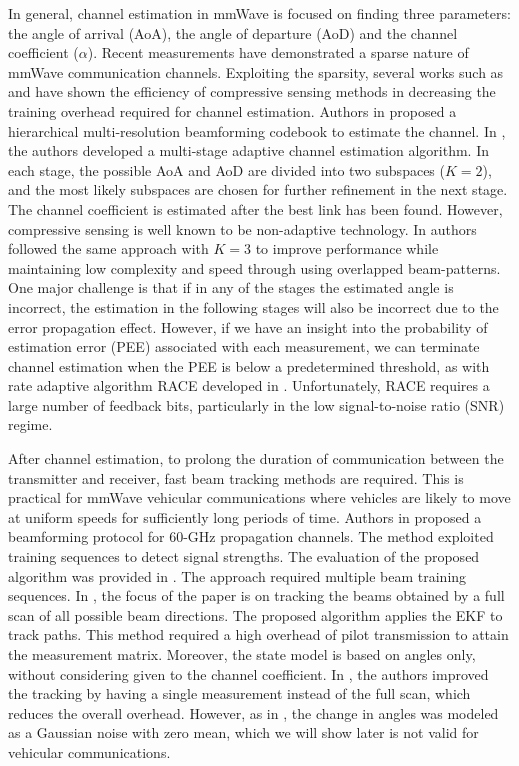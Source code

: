 \documentclass{ieeeaccess}
\begin{document}
In general, channel estimation in mmWave is focused on finding three parameters: the angle of arrival (AoA), the angle of departure (AoD) and the channel coefficient ($\alpha$). Recent measurements have demonstrated a sparse nature of mmWave communication channels\cite{ref6}. Exploiting the sparsity, several works such as \cite{c2} and \cite{RH} have shown the efficiency of compressive sensing methods in decreasing the training overhead required for channel estimation. Authors in \cite{c1} proposed a hierarchical multi-resolution beamforming codebook to estimate the channel. In \cite{RH}, the authors developed a multi-stage adaptive channel estimation algorithm. In each stage, the possible AoA and AoD are divided into two subspaces ($K = 2$), and the most likely subspaces are chosen for further refinement in the next stage. The channel coefficient is estimated after the best link has been found. However, compressive sensing is well known to be non-adaptive technology. In \cite{overlap} authors followed the same approach with $K = 3$ to improve performance while maintaining low complexity and speed through using overlapped beam-patterns. One major challenge is that if in any of the stages the estimated angle is incorrect, the estimation in the following stages will also be incorrect due to the error propagation effect. However, if we have an insight into the probability of estimation error (PEE) associated with each measurement, we can terminate channel estimation when the PEE is below a predetermined threshold, as with rate adaptive algorithm RACE developed in \cite{RACE}. Unfortunately, RACE requires a large number of feedback bits, particularly in the low signal-to-noise ratio (SNR) regime.

After channel estimation, to prolong the duration of communication between the transmitter and receiver, fast beam tracking methods are required. This is practical for mmWave vehicular communications where vehicles are likely to move at uniform speeds for sufficiently long periods of time. Authors in \cite{midc} proposed a beamforming protocol for 60-GHz propagation channels. The method exploited training sequences to detect signal strengths. The evaluation of the proposed algorithm was provided in \cite{midc2}. The approach required multiple beam training sequences. In \cite{zhang}, the focus of the paper is on tracking the beams obtained by a full scan of all possible beam directions. The proposed algorithm applies the EKF to track paths. This method required a high overhead of pilot transmission to attain the measurement matrix. Moreover, the state model is based on angles only, without considering given to the channel coefficient. In \cite{rr}, the authors improved the tracking by having a single measurement instead of the full scan, which reduces the overall overhead. However, as in \cite{zhang}, the change in angles was modeled as a Gaussian noise with zero mean, which we will show later is not valid for vehicular communications.
\end{document}
